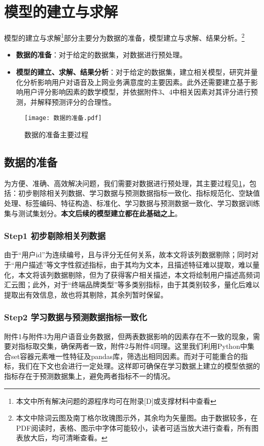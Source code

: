 \documentclass{MathorCupmodeling}
\begin{document}
	\section{模型的建立与求解}
	模型的建立与求解\textcolor{blue}{\footnote{本文中所有解决问题的源程序均可在附录[D]或支撑材料中查看}}部分主要分为数据的准备，模型建立与求解、结果分析。\textcolor{blue}{\footnote{本文中除词云图及南丁格尔玫瑰图示外，其余均为矢量图。由于数据较多，在PDF阅读时，表格、图示中字体可能较小，读者可适当放大进行查看，所有图表放大后，均可清晰查看。}}
	\begin{itemize}
		\item \textbf{数据的准备}：对于给定的数据集，对数据进行预处理。
		\item \textbf{模型的建立、求解、结果分析}：对于给定的数据集，建立相关模型，研究并量化分析影响用户对语音及上网业务满意度的主要因素。此外还需要建立基于影响用户评分影响因素的数学模型，并依据附件3、4中相关因素对其评分进行预测，并解释预测评分的合理性。
	\end{itemize}
	\begin{figure}[H]
		\centerline{\texttt{[image: 数据的准备.pdf]}}
		\caption{数据的准备主要过程}\label{fig:dataprepare}
	\end{figure}
	\subsection{数据的准备}
	为方便、准确、高效解决问题，我们需要对数据进行预处理，其主要过程见\textcolor{blue}{\cref{fig:dataprepare}}，包括：初步剔除相关列数据、学习数据与预测数据指标一致化、指标规范化、空缺值处理、标签编码、特征构造、标准化、学习数据与预测数据一致化、学习数据训练集与测试集划分。\textbf{本文后续的模型建立都在此基础之上}。
	\subsubsection*{Step1 初步剔除相关列数据}
	由于“用户id”为连续编号，且与评分无任何关系，故本文将该列数据剔除；同时对于“用户描述”等文字性叙述指标，由于其均为文本，且描述特征难以提取，难以量化，本文将该列数据剔除，但为了获得客户相关描述，本文将绘制用户描述高频词汇云图；此外，对于“终端品牌类型”等多类别指标，由于其类别较多，量化后难以提取出有效信息，故也将其剔除，其余列暂时保留。
	\subsubsection*{Step2 学习数据与预测数据指标一致化}
	附件1与附件3为用户语音业务数据，但两表数据影响的因素存在不一致的现象，需要对指标取交集，确保两者一致，附件2与附件4同理。这里我们利用Python中集合set容器元素唯一性特征及pandas库，筛选出相同因素。而对于可能重合的指标，我们在下文也会进行一定处理。这样即可确保在学习数据上建立的模型依据的指标存在于预测数据集上，避免两者指标不一的情况。
\end{document}
